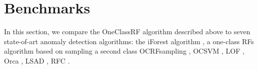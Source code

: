 %

\section{Benchmarks}
\label{ocrf:sec:benchmark}
%
In this section, we compare the \ac{OneClassRF} algorithm described above to
seven state-of-art anomaly detection algorithms: the \ac{iForest} algorithm
\citep{Liu2008}, a one-class \acp{RF} algorithm based on sampling a
second class \ac{OCRFsampling} \citep{Desir13}, \acf{OCSVM}
\citep{Scholkopf2001}, \acf{LOF} \citep{Breunig2000LOF}, Orca \citep{Bay2003},
\acf{LSAD} \citep{Quinn2014}, \acf{RFC} \citep{Shi2012}.
%
